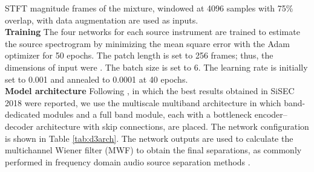 \documentclass[final]{cvpr}
\begin{document}
STFT magnitude frames of the mixture, windowed at 4096 samples with 75\% overlap, with data augmentation \cite{Uhlich17} are used as inputs. 
\vspace{3mm}\\
\textbf{Training} \hspace{1mm}
The four networks for each source instrument are trained to estimate the source spectrogram by minimizing the mean square error with the Adam optimizer for 50 epochs. The patch length is set to 256 frames; thus, the dimensions of input were . The batch size is set to 6. The learning rate is initially set to 0.001 and annealed to 0.0001 at 40 epochs.
\vspace{3mm}\\
\textbf{Model architecture} \hspace{1mm}
Following \cite{Takahashi17,Takahashi18MMDenseLSTM}, in which the best results obtained in SiSEC 2018 were reported, we use the multiscale multiband architecture in which band-dedicated modules and a full band module, each with a bottleneck encoder--decoder architecture with skip connections, are placed. The network configuration is shown in Table \ref{tab:d3arch}. The network outputs are used to calculate the multichannel Wiener filter (MWF) to obtain the final separations, as commonly performed in frequency domain audio source separation methods \cite{Takahashi18MMDenseLSTM, Uhlich17, Liu19, Samuel20}.
\begin{table}[t]
\caption{\label{tab:mss} SDRs for MUSDB18 dataset. 
'*' denotes the method operating in the time domain.}
\vspace{2mm}
\end{table}
\end{document}
